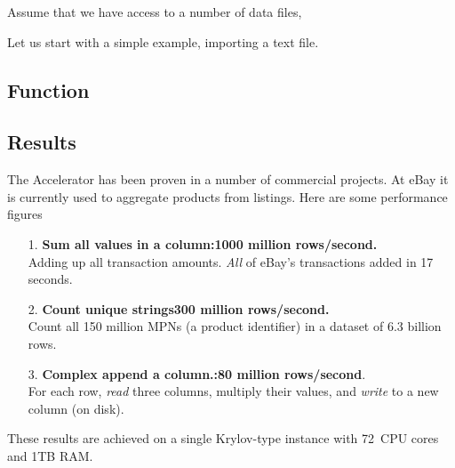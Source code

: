 \documentclass[a4paper]{article}
\begin{document}
Assume that we have access to a number of data files,

Let us start with a simple example, importing a text file.







\subsection*{Function}


\subsection*{Results}
The Accelerator has been proven in a number of commercial projects.
At eBay it is currently used to aggregate products from listings.
Here are some performance figures
\begin{itemize}
\item[1.]  \textbf{Sum all values in a column:\hfill 1000 million rows/second.}\\
  Adding up all transaction amounts.  \textsl{All} of eBay's
  transactions added in 17 seconds.
\item[2.]  \textbf{Count unique strings\hfill  300 million rows/second.}\\
Count all 150 million MPNs (a product identifier) in a dataset of 6.3
billion rows.
\item[3.]  \textbf{Complex append a column.:\hfill 80 million rows/second}.\\
  For each row, \textsl{read} three columns, multiply their values,
  and \textsl{write} to a new column (on disk).
\end{itemize}

\noindent These results are achieved on a single Krylov-type instance with
72~CPU cores and 1TB RAM.







\end{document}
